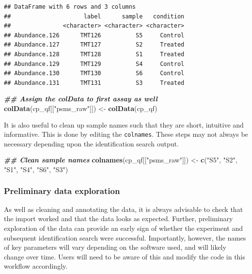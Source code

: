 \documentclass[9pt,a4paper,]{extarticle}
\newenvironment{Shaded}{\begin{snugshade}}{\end{snugshade}}
\newcommand{\DocumentationTok}[1]{\textcolor[rgb]{0.56,0.35,0.01}{\textbf{\textit{#1}}}}
\newcommand{\FunctionTok}[1]{\textcolor[rgb]{0.13,0.29,0.53}{\textbf{#1}}}
\newcommand{\NormalTok}[1]{#1}
\newcommand{\OtherTok}[1]{\textcolor[rgb]{0.56,0.35,0.01}{#1}}
\newcommand{\StringTok}[1]{\textcolor[rgb]{0.31,0.60,0.02}{#1}}
\begin{document}
\begin{verbatim}
## DataFrame with 6 rows and 3 columns
##                     label      sample   condition
##               <character> <character> <character>
## Abundance.126      TMT126          S5     Control
## Abundance.127      TMT127          S2     Treated
## Abundance.128      TMT128          S1     Treated
## Abundance.129      TMT129          S4     Control
## Abundance.130      TMT130          S6     Control
## Abundance.131      TMT131          S3     Treated
\end{verbatim}

\begin{Shaded}
\begin{Highlighting}[]
\DocumentationTok{\#\# Assign the colData to first assay as well}
\FunctionTok{colData}\NormalTok{(cp\_qf[[}\StringTok{"psms\_raw"}\NormalTok{]]) }\OtherTok{\textless{}{-}} \FunctionTok{colData}\NormalTok{(cp\_qf)}
\end{Highlighting}
\end{Shaded}

It is also useful to clean up sample names such that they are short, intuitive
and informative. This is done by editing the \texttt{colnames}. These steps may not
always be necessary depending upon the identification search output.

\begin{Shaded}
\begin{Highlighting}[]
\DocumentationTok{\#\# Clean sample names}
\FunctionTok{colnames}\NormalTok{(cp\_qf[[}\StringTok{"psms\_raw"}\NormalTok{]]) }\OtherTok{\textless{}{-}} \FunctionTok{c}\NormalTok{(}\StringTok{"S5"}\NormalTok{, }\StringTok{"S2"}\NormalTok{, }\StringTok{"S1"}\NormalTok{, }\StringTok{"S4"}\NormalTok{, }\StringTok{"S6"}\NormalTok{, }\StringTok{"S3"}\NormalTok{)}
\end{Highlighting}
\end{Shaded}

\subsubsection{Preliminary data exploration}\label{preliminary-data-exploration}

As well as cleaning and annotating the data, it is always advisable to check
that the import worked and that the data looks as expected. Further, preliminary
exploration of the data can provide an early sign of whether the experiment and
subsequent identification search were successful. Importantly, however, the
names of key parameters will vary depending on the software used, and will
likely change over time. Users will need to be aware of this and modify the code
in this workflow accordingly.
\end{document}
